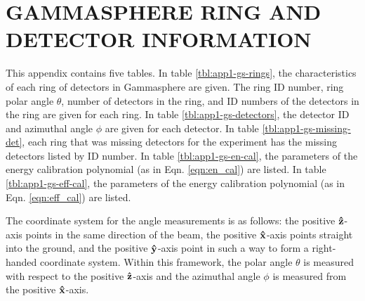 %
%

\chapter{GAMMASPHERE RING AND DETECTOR INFORMATION}
\label{app:gs-rings-and-detectors}
This appendix contains five tables. In table \ref{tbl:app1-gs-rings}, the characteristics of each ring of detectors in Gammasphere are given. The ring ID number, ring polar angle $\theta$, number of detectors in the ring, and ID numbers of the detectors in the ring are given for each ring. In table \ref{tbl:app1-gs-detectors}, the detector ID and azimuthal angle $\phi$ are given for each detector. In table \ref{tbl:app1-gs-missing-det}, each ring that was missing detectors for the experiment has the missing detectors listed by ID number. In table \ref{tbl:app1-gs-en-cal}, the parameters of the energy calibration polynomial (as in Eqn. \ref{eqn:en_cal}) are listed. In table \ref{tbl:app1-gs-eff-cal}, the parameters of the energy calibration polynomial (as in Eqn. \ref{eqn:eff_cal}) are listed.

The coordinate system for the angle measurements is as follows: the positive $\boldsymbol{\hat{\textbf{z}}}$-axis points in the same direction of the beam, the positive $\boldsymbol{\hat{\textbf{x}}}$-axis points straight into the ground, and the positive $\boldsymbol{\hat{\textbf{y}}}$-axis point in such a way to form a right-handed coordinate system. Within this framework, the polar angle $\theta$ is measured with respect to the positive $\boldsymbol{\hat{\textbf{z}}}$-axis and the azimuthal angle $\phi$ is measured from the positive $\boldsymbol{\hat{\textbf{x}}}$-axis.


